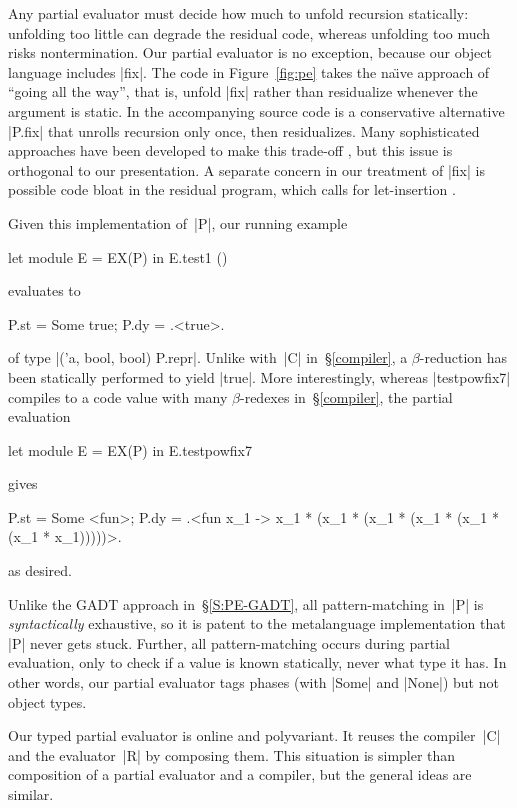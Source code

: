 \documentclass[preprint]{sigplanconf}
\begin{document}
Any partial evaluator must decide how much to unfold recursion
statically: unfolding too little can degrade the residual code, whereas
unfolding too much risks nontermination.  Our partial evaluator is no
exception, because our object language includes |fix|.  The code in
Figure~\ref{fig:pe} takes the na\"\i ve approach of ``going all the
way'', that is, unfold |fix| rather than residualize whenever the
argument is static.  In the accompanying source code is a conservative
alternative |P.fix| that unrolls recursion only once, then residualizes.
Many sophisticated approaches have been developed to make this trade-off
\citep{jones-partial}, but this issue is orthogonal to our presentation.
A separate concern in our treatment of |fix| is possible code bloat in
the residual program, which calls for let-insertion
\citep{SwadiTahaKiselyovPasalic2006}.

Given this implementation of~|P|, our running example
\begin{code}
let module E = EX(P) in E.test1 ()
\end{code}
evaluates to
\begin{code}
{P.st = Some true; P.dy = .<true>.}
\end{code}
of type |('a, bool, bool) P.repr|.  Unlike with~|C| in~\S\ref{compiler},
a $\beta$-reduction has been statically performed to yield |true|.  More
interestingly, whereas |testpowfix7| compiles to a code value with many
$\beta$-redexes in~\S\ref{compiler}, the partial evaluation
\begin{code}
let module E = EX(P) in E.testpowfix7
\end{code}
gives
\begin{code}
{P.st = Some <fun>;
 P.dy = .<fun x_1 -> x_1 * (x_1 * (x_1 * (x_1 *
                    (x_1 * (x_1 * x_1)))))>.}
\end{code}
as desired.

Unlike the GADT approach in~\S\ref{S:PE-GADT}, all pattern\hyp matching
in~|P| is \emph{syntactically} exhaustive, so it is patent to the metalanguage
implementation that |P| never gets stuck.  Further, all pattern\hyp matching occurs
during partial evaluation, only to check if a value is known statically,
never what type it has.  In other words, our partial evaluator tags
phases (with |Some| and |None|) but not object types.

Our typed partial evaluator is online and polyvariant.  It reuses the
compiler~|C| and the evaluator~|R| by composing them.  This situation is
simpler than  composition of a partial
evaluator and a compiler, but the general ideas are similar.
\end{document}
